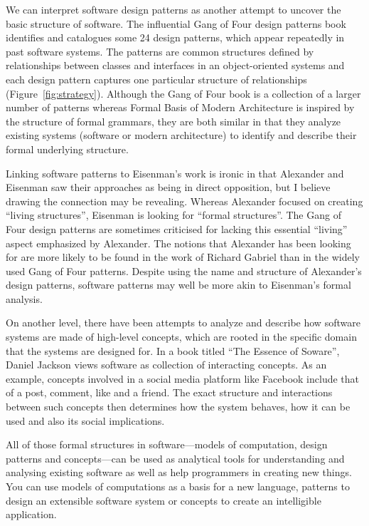 We can interpret software design patterns as another attempt to uncover the basic
structure of software. The influential Gang of Four design patterns book identifies
and catalogues some 24 design patterns, which appear repeatedly in past software systems. The
patterns are common structures defined by relationships between classes and interfaces in an
object-oriented systems and each design pattern captures one particular structure
of relationships (Figure~\ref{fig:strategy}). Although the Gang of Four book is a collection of
a larger number of patterns whereas Formal Basis of Modern Architecture is inspired by the structure
of formal grammars, they are both similar in that they analyze existing systems (software or modern
architecture) to identify and describe their formal underlying structure.

Linking software patterns to Eisenman's work is ironic in that Alexander and Eisenman saw
their approaches as being in direct opposition, but I believe drawing the connection
may be revealing. Whereas Alexander focused on creating ``living structures'', Eisenman is looking
for ``formal structures''. The Gang of Four design patterns are sometimes criticised for lacking
this essential ``living'' aspect emphasized by Alexander. The notions that Alexander has been
looking for are more likely to be found in the work of Richard Gabriel
than in the widely used Gang of Four patterns. Despite using the name and structure of Alexander's
design patterns, software patterns may well be more akin to Eisenman's formal analysis.

On another level, there have been attempts to analyze and describe how software systems are made of
high-level concepts, which are rooted in the specific domain that the systems are designed
for. In a book titled ``The Essence of Soware'', Daniel Jackson views software
as collection of interacting concepts. As an example, concepts involved in a social media
platform like Facebook include that of a post, comment, like and a friend. The exact structure
and interactions between such concepts then determines how the system behaves, how it can be
used and also its social implications.

All of those formal structures in software---models of computation, design patterns and
concepts---can be used as analytical tools for understanding and analysing existing software
as well as help programmers in creating new things. You can use models of computations as a
basis for a new language, patterns to design an extensible software system or concepts to
create an intelligible application.

